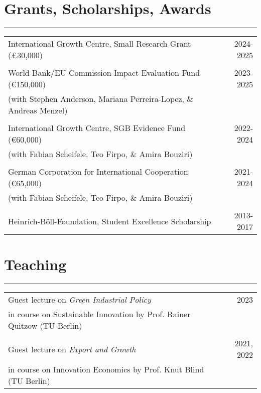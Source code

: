 \documentclass[10pt,a4paper]{article}
\begin{document}
\section*{Grants, Scholarships, Awards}
\hrule
\vspace{1mm}
\begin{tabularx}{\textwidth}{@{}Xr@{}}
International Growth Centre, Small Research Grant (£30,000) & 2024-2025 \\
\smallskip \\
World Bank/EU Commission Impact Evaluation Fund (\euro150,000) & 2023-2025 \\
(with Stephen Anderson, Mariana Perreira-Lopez, \& Andreas Menzel) & \\
\smallskip \\
International Growth Centre, SGB Evidence Fund (\euro60,000) & 2022-2024 \\
(with Fabian Scheifele, Teo Firpo, \& Amira Bouziri) & \\
\smallskip \\
German Corporation for International Cooperation (\euro65,000) & 2021-2024 \\
(with Fabian Scheifele, Teo Firpo, \& Amira Bouziri) & \\
\smallskip \\
Heinrich-Böll-Foundation, Student Excellence Scholarship & 2013-2017 \\
\end{tabularx}

\section*{Teaching}
\hrule
\vspace{1mm}

\begin{tabularx}{\textwidth}{@{}Xr@{}}
Guest lecture on \textit{Green Industrial Policy} & \hfill 2023 \\
in course on Sustainable Innovation by Prof. Rainer Quitzow (TU Berlin) & \\
\\
Guest lecture on \textit{Export and Growth} & \hfill 2021, 2022 \\
in course on Innovation Economics by Prof. Knut Blind (TU Berlin) & \\
\end{tabularx}

\end{document}
